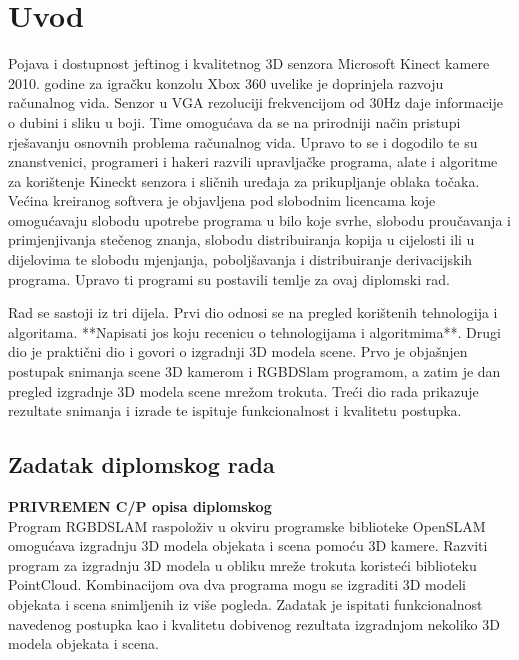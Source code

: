 \newpage

\setcounter{page}{1}
\setcounter{figure}{0}
\section{Uvod}%
\label{sec:Uvod}


Pojava i dostupnost jeftinog i kvalitetnog 3D senzora Microsoft Kinect
kamere 2010. godine za igračku konzolu Xbox 360 uvelike je doprinjela
razvoju računalnog vida. Senzor u VGA rezoluciji frekvencijom od 30Hz
daje informacije o dubini i sliku u boji. Time omogućava da se na
prirodniji način pristupi rješavanju osnovnih problema računalnog vida.
Upravo to se i dogodilo te su znanstvenici, programeri i hakeri 
razvili upravljačke programa, alate i algoritme za korištenje Kineckt
senzora i sličnih uređaja za prikupljanje oblaka točaka. Većina
kreiranog softvera je objavljena pod slobodnim licencama koje
omogućavaju slobodu upotrebe programa u bilo koje svrhe, slobodu
proučavanja i primjenjivanja stečenog znanja, slobodu distribuiranja
kopija u cijelosti ili u dijelovima te slobodu mjenjanja, poboljšavanja
i distribuiranje derivacijskih programa. Upravo ti programi su postavili
temlje za ovaj diplomski rad.

Rad se sastoji iz tri dijela. Prvi dio odnosi se na pregled korištenih
tehnologija i algoritama. **Napisati jos koju recenicu o tehnologijama i
algoritmima**. Drugi dio je praktični dio i govori o izgradnji 3D modela
scene. Prvo je objašnjen postupak snimanja scene 3D kamerom i RGBDSlam
programom, a zatim je dan pregled izgradnje 3D modela scene mrežom
trokuta. Treći dio rada prikazuje rezultate snimanja i izrade te ispituje
funkcionalnost i kvalitetu postupka.


\newpage
\subsection{Zadatak diplomskog rada} %
\label{sub:Zadatak diplomskog rada}
\textbf{PRIVREMEN C/P opisa diplomskog} 
\\
Program RGBDSLAM raspoloživ u okviru programske biblioteke OpenSLAM
omogućava izgradnju 3D modela objekata i scena pomoću 3D kamere.
Razviti program za izgradnju 3D modela u obliku mreže trokuta koristeći
biblioteku PointCloud. Kombinacijom ova dva programa mogu se izgraditi
3D modeli objekata i scena snimljenih iz više pogleda. Zadatak je
ispitati funkcionalnost navedenog postupka kao i kvalitetu dobivenog
rezultata izgradnjom nekoliko 3D modela objekata i scena.

